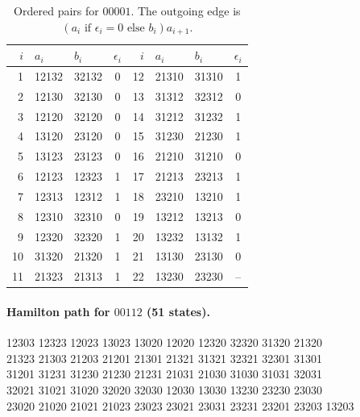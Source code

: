 \begin{table}[htbp]
\centering
\caption{Ordered pairs for $00001$. The outgoing edge is
$(a_i\text{ if }\epsilon_i=0\text{ else }b_i)a_{i+1}$.}
\label{tab:matching-chain-00001}
\begingroup\small\ttfamily
\begin{tabular}{rllc@{\qquad}rllc}
$i$ & $a_i$ & $b_i$ & $\epsilon_i$ & $i$ & $a_i$ & $b_i$ & $\epsilon_i$ \\ \hline
1 & 12132 & 32132 & 0 & 12 & 21310 & 31310 & 1 \\
2 & 12130 & 32130 & 0 & 13 & 31312 & 32312 & 0 \\
3 & 12120 & 32120 & 0 & 14 & 31212 & 31232 & 1 \\
4 & 13120 & 23120 & 0 & 15 & 31230 & 21230 & 1 \\
5 & 13123 & 23123 & 0 & 16 & 21210 & 31210 & 0 \\
6 & 12123 & 12323 & 1 & 17 & 21213 & 23213 & 1 \\
7 & 12313 & 12312 & 1 & 18 & 23210 & 13210 & 1 \\
8 & 12310 & 32310 & 0 & 19 & 13212 & 13213 & 0 \\
9 & 12320 & 32320 & 1 & 20 & 13232 & 13132 & 1 \\
10 & 31320 & 21320 & 1 & 21 & 13130 & 23130 & 0 \\
11 & 21323 & 21313 & 1 & 22 & 13230 & 23230 & -- \\
\end{tabular}\endgroup
\end{table}

\paragraph{Hamilton path for $00112$ (51 states).}
\begingroup\small\ttfamily\begin{flushleft}
12303 12323 12023 13023 13020 12020 12320 32320 31320 21320\\
21323 21303 21203 21201 21301 21321 31321 32321 32301 31301\\
31201 31231 31230 21230 21231 21031 21030 31030 31031 32031\\
32021 31021 31020 32020 32030 12030 13030 13230 23230 23030\\
23020 21020 21021 21023 23023 23021 23031 23231 23201 23203 13203
\end{flushleft}\endgroup

